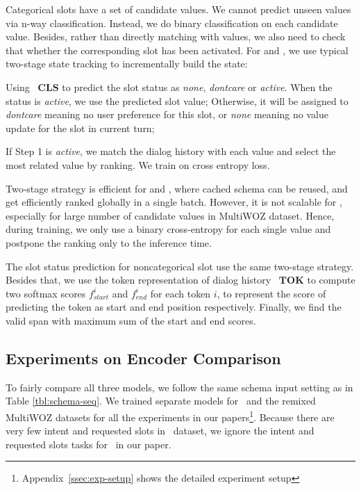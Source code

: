  Categorical slots have a set of candidate
values. We cannot predict unseen values via n-way
classification. Instead, we do binary classification on each candidate
value. Besides, rather than directly matching with values, we also
need to check that whether the corresponding slot has been
activated. For \CE and \FE, we use typical two-stage state tracking to
incrementally build the state:
\begin{inparaenum}[{\bf Step} 1.]
\item Using ~$\mathbf{CLS}$ to predict the slot status as
  \textit{none}, \textit{dontcare} or \textit{active}. When the status is
  \textit{active}, we use the predicted slot value; Otherwise, it
  will be assigned to \textit{dontcare} meaning no user preference for this
  slot, or \textit{none} meaning no value update for the slot in current turn;
\item If Step 1 is \textit{active}, we match the dialog
  history with each value and select the most related value by ranking. We train on cross entropy loss.
\end{inparaenum}
Two-stage strategy is efficient for \DE and \FE, where cached schema
can be reused, and get efficiently ranked globally in a single
batch. However, it is not scalable for \CE, especially for large
number of candidate values in MultiWOZ dataset. Hence, during
training, we only use a binary cross-entropy for each single value and
postpone the ranking only to the inference time.

 The slot status prediction for
noncategorical slot use the same two-stage strategy. Besides that, we
use the token representation of dialog history ~$\mathbf{TOK}$ to
compute two softmax scores $f^{i}_{start}$ and $f^{i}_{end}$ for each
token $i$, to represent the score of predicting the token as start and
end position respectively. Finally, we find the valid span with
maximum sum of the start and end scores.

\subsection{Experiments on Encoder Comparison}
\label{ssec:encoder-results}
To fairly compare all three models, we follow the same schema input
setting as in Table \ref{tbl:schema-seq}. We trained separate models
for \sgdst~and the remixed MultiWOZ datasets for all the experiments
in our papers\footnote{Appendix~\ref{ssec:exp-setup} shows the
  detailed experiment setup}. Because there are very few intent and
requested slots in \multiwoz~dataset, we ignore the intent and
requested slots tasks for \multiwoz~in our paper.


